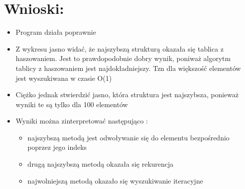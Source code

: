 \documentclass[10 pt]{article}
\begin{document}
\section{Wnioski:}
\begin{itemize}
\item Program działa poprawnie
\item Z wykresu jasno widać, że najszybszą strukturą okazała się tablica z haszowaniem. Jest to prawdopodobnie dobry wynik, poniważ algorytm tablicy z haszowaniem jest najdokładniejszy. Tzn dla większość elementów jest wyszukiwana w czasie O(1)
\item Ciężko jednak stwierdzić jasno, która struktura jest najszybsza, ponieważ wyniki te są tylko dla 100 elementów
\item Wyniki można zinterpretować następująco : 
\begin{itemize}
\item najszybszą metodą jest odwoływanie się do elementu bezpośrednio poprzez jego indeks
\item drugą najszybszą metodą okazała się rekurencja
\item najwolniejszą metodą okazało się wyszukiwanie iteracyjne
\end{itemize}

\end{itemize}
\end{document}
